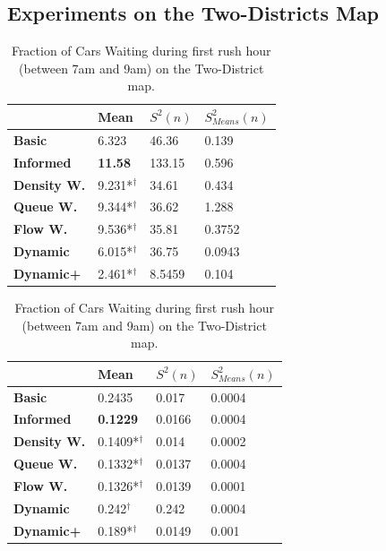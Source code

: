 \documentclass[11pt]{article}
\begin{document}
\subsection{Experiments on the Two-Districts Map}
\begin{table}[t]
\centering
\caption{Average Velocity of Cars during first rush hour (between 7am and 9am) on the Two-Districts map.}
\label{tab:velo-morning-twodi}
\begin{tabular}{l|l|l|l|}
\textbf{}                 & \textbf{Mean} & \textbf{$S^2(n)$} & \textbf{$S_{Means}^2(n)$} \\
\hline\textbf{Basic}      & 6.323          & 46.36             & 0.139                      \\
\textbf{Informed}   & \textbf{11.58}          & 133.15            & 0.596                      \\
\hline\textbf{Density W.} & 9.231*$^\dagger$          & 34.61             & 0.434                      \\
\textbf{Queue W.}   & 9.344*$^\dagger$ & 36.62             & 1.288                      \\
\textbf{Flow W.}    & 9.536*$^\dagger$          & 35.81             & 0.3752                     \\
\textbf{Dynamic}    & 6.015*$^\dagger$          & 36.75             & 0.0943                     \\
\textbf{Dynamic+}   & 2.461*$^\dagger$          & 8.5459            & 0.104                     
\end{tabular}
\vspace{20pt}
\centering
\caption{Fraction of Cars Waiting during first rush hour (between 7am and 9am) on the Two-District map.}
\label{tab:waiting-morning-twodi}
\begin{tabular}{l|l|l|l|}
\textbf{}                 & \textbf{Mean} & \textbf{$S^2(n)$} & \textbf{$S_{Means}^2(n)$} \\
\hline\textbf{Basic}      & 0.2435          & 0.017             & 0.0004                     \\
\textbf{Informed}   & \textbf{0.1229} & 0.0166            & 0.0004                     \\
\hline\textbf{Density W.} & 0.1409*$^\dagger$          & 0.014             & 0.0002                     \\
\textbf{Queue W.}   & 0.1332*$^\dagger$          & 0.0137            & 0.0004                     \\
\textbf{Flow W.}    & 0.1326*$^\dagger$      & 0.0139            & 0.0001                     \\
\textbf{Dynamic}    & 0.242$^\dagger$          & 0.242             & 0.0004                     \\
\textbf{Dynamic+}   & 0.189*$^\dagger$          & 0.0149             & 0.001                    
\end{tabular}
\end{table}
\end{document}
